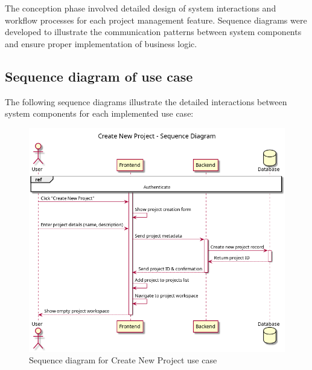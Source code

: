 The conception phase involved detailed design of system interactions and workflow processes for each project management feature. Sequence diagrams were developed to illustrate the communication patterns between system components and ensure proper implementation of business logic.

\subsection{Sequence diagram of use case}

The following sequence diagrams illustrate the detailed interactions between system components for each implemented use case:

\begin{figure}[H]
\centering
\includegraphics[width=\textwidth]{conception/SprintIII/sequence_diagrams/sequence_projectManagement_3_1_CreateNewProject.png}
\caption{Sequence diagram for Create New Project use case}
\label{fig:seq_create_project}
\end{figure}

